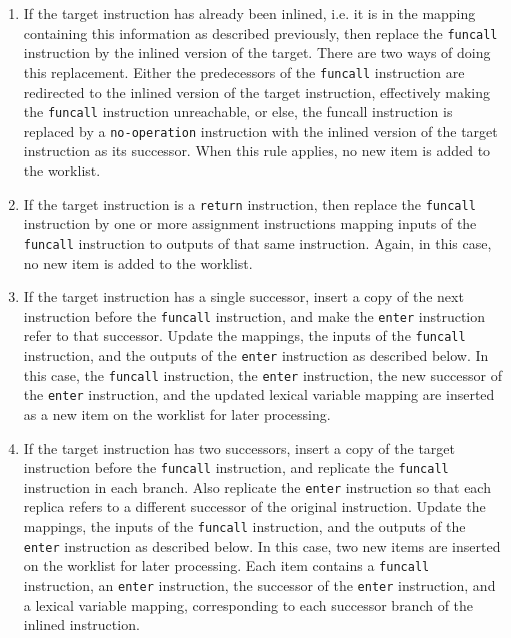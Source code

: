 \begin{enumerate}
\item If the target instruction has already been inlined, i.e. it is
  in the mapping containing this information as described previously,
  then replace the \texttt{funcall} instruction by the inlined version
  of the target.  There are two ways of doing this replacement.
  Either the predecessors of the \texttt{funcall} instruction are
  redirected to the inlined version of the target instruction,
  effectively making the \texttt{funcall} instruction unreachable, or
  else, the funcall instruction is replaced by a \texttt{no-operation}
  instruction with the inlined version of the target instruction as
  its successor.  When this rule applies, no new item is added to the
  worklist.
\item If the target instruction is a \texttt{return} instruction, then
  replace the \texttt{funcall} instruction by one or more assignment
  instructions mapping inputs of the \texttt{funcall} instruction to
  outputs of that same instruction.  Again, in this case, no new item
  is added to the worklist.
\item If the target instruction has a single successor, insert a copy
  of the next instruction before the \texttt{funcall} instruction, and
  make the \texttt{enter} instruction refer to that successor.  Update
  the mappings, the inputs of the \texttt{funcall} instruction, and
  the outputs of the \texttt{enter} instruction as described below.
  In this case, the \texttt{funcall} instruction, the \texttt{enter}
  instruction, the new successor of the \texttt{enter} instruction,
  and the updated lexical variable mapping are inserted as a new item
  on the worklist for later processing.
\item If the target instruction has two successors, insert a copy of
  the target instruction before the \texttt{funcall} instruction, and
  replicate the \texttt{funcall} instruction in each branch.  Also
  replicate the \texttt{enter} instruction so that each replica refers
  to a different successor of the original instruction.  Update the
  mappings, the inputs of the \texttt{funcall} instruction, and the
  outputs of the \texttt{enter} instruction as described below.  In
  this case, two new items are inserted on the worklist for later
  processing.  Each item contains a \texttt{funcall} instruction, an
  \texttt{enter} instruction, the successor of the \texttt{enter}
  instruction, and a lexical variable mapping, corresponding to each
  successor branch of the inlined instruction.
\end{enumerate}

